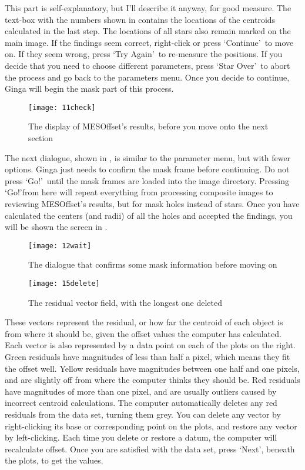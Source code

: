 \documentclass[10pt]{article}
\begin{document}
This part is self-explanatory, but I'll describe it anyway, for good measure. The text-box with the numbers shown in  contains the locations of the centroids calculated in the last step. The locations of all stars also remain marked on the main image. If the findings seem correct, right-click or press \lq Continue\rq\ to move on. If they seem wrong, press \lq Try Again\rq\ to re-measure the positions. If you decide that you need to choose different parameters, press \lq Star Over\rq\ to abort the process and go back to the parameters menu. Once you decide to continue, Ginga will begin the mask part of this process.

\begin{figure}[!ht]
	\centering
	\texttt{[image: 11check]}
	\caption{The display of MESOffset's results, before you move onto the next section}
 	\label{fig:check}
\end{figure}

The next dialogue, shown in , is similar to the parameter menu, but with fewer options. Ginga just needs to confirm the mask frame before continuing. Do not press \lq Go!\rq\ until the mask frames are loaded into the image directory. Pressing \lq Go!\rq from here will repeat everything from processing composite images to reviewing MESOffset's results, but for mask holes instead of stars. Once you have calculated the centers (and radii) of all the holes and accepted the findings, you will be shown the screen in .

\begin{figure}[!ht]
	\centering
	\texttt{[image: 12wait]}
	\caption{The dialogue that confirms some mask information before moving on}
 	\label{fig:wait}
\end{figure}

\begin{figure}[!ht]
    \centering
    \texttt{[image: 15delete]}
    \caption{The residual vector field, with the longest one deleted}
    \label{fig:resviewer}
\end{figure}

These vectors represent the residual, or how far the centroid of each object is from where it should be, given the offset values the computer has calculated. Each vector is also represented by a data point on each of the plots on the right. Green residuals have magnitudes of less than half a pixel, which means they fit the offset well. Yellow residuals have magnitudes between one half and one pixels, and are slightly off from where the computer thinks they should be. Red residuals have magnitudes of more than one pixel, and are usually outliers caused by incorrect centroid calculations. The computer automatically deletes any red residuals from the data set, turning them grey. You can delete any vector by right-clicking its base or corresponding point on the plots, and restore any vector by left-clicking. Each time you delete or restore a datum, the computer will recalculate offset. Once you are satisfied with the data set, press \lq Next\rq, beneath the plots, to get the values.
\end{document}
